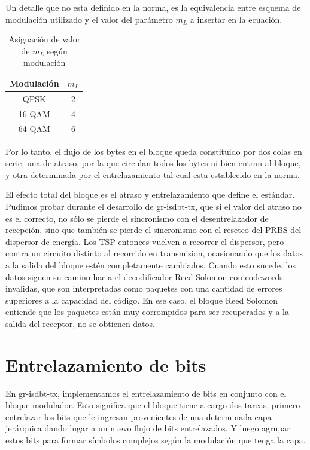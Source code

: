 Un detalle que no esta definido en la norma, es la equivalencia entre esquema de modulación utilizado y el valor del parámetro $m_L$ a insertar en la ecuación. 

\begin{table}[h!]
	\centering
	\begin{tabular}{|c|c|}
		\hline
		\textbf{Modulación} & \textbf{$m_L$}\\
		\hline
		QPSK		& 2\\
		\hline
		16-QAM 		& 4\\
		\hline
		64-QAM		& 6\\
		\hline
	\end{tabular}
	\caption{\label{corr_ml} Asignación de valor de $m_L$ según modulación}
\end{table}

Por lo tanto, el flujo de los bytes en el bloque queda constituido por dos colas en serie, una de atraso, por la que circulan todos los bytes ni bien entran al bloque, y otra determinada por el entrelazamiento tal cual esta establecido en la norma. 

El efecto total del bloque es el atraso y entrelazamiento que define el estándar. Pudimos probar durante el desarrollo de gr-isdbt-tx, que si el valor del atraso no es el correcto, no sólo se pierde el sincronismo con el desentrelazador de recepción, sino que también se pierde el sincronismo con el reseteo del PRBS del dispersor de energía. Los TSP entonces vuelven a recorrer el dispersor, pero contra un circuito distinto al recorrido en transmision, ocasionando que los datos a la salida del bloque estén completamente cambiados. Cuando esto sucede, los datos siguen su camino hacia el decodificador Reed Solomon con codewords invalidas, que son interpretadas como paquetes con una cantidad de errores superiores a la capacidad del código. En ese caso, el bloque Reed Solomon entiende que los paquetes están muy corrompidos para ser recuperados y a la salida del receptor, no se obtienen datos.
  
\section{Entrelazamiento de bits}

En gr-isdbt-tx, implementamos el entrelazamiento de bits en conjunto con el bloque modulador. Esto significa que el bloque tiene a cargo dos tareas, primero entrelazar los bits que le ingresan provenientes de una determinada capa jerárquica dando lugar a un nuevo flujo de bits entrelazados. Y luego agrupar estos bits para formar símbolos complejos según la modulación que tenga la capa.

